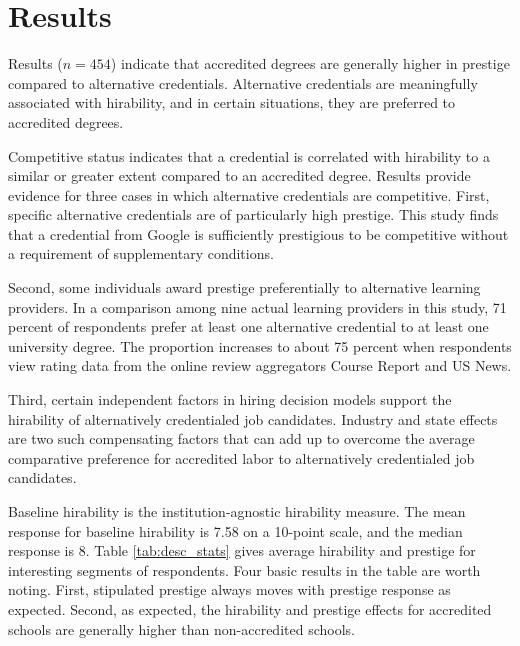 \documentclass[review]{elsarticle}
\begin{document}
\section{Results}

Results ($n = 454$) indicate that accredited degrees are generally higher in prestige compared to alternative credentials.
Alternative credentials are meaningfully associated with hirability,
and in certain situations, they are preferred to accredited degrees.

Competitive status indicates that a credential is correlated with hirability to a similar or greater extent compared to an accredited degree.
Results provide evidence for three cases in which alternative credentials are competitive.
First, specific alternative credentials are of particularly high prestige.
This study finds that a credential from Google is sufficiently prestigious to be competitive without a requirement of supplementary conditions.

Second, some individuals award prestige preferentially to alternative learning providers.
In a comparison among nine actual learning providers in this study,
71 percent of respondents prefer at least one alternative credential to at least one university degree.
The proportion increases to about 75 percent when respondents view rating data from the online review aggregators Course Report and US News.

Third, certain independent factors in hiring decision models support the hirability of alternatively credentialed job candidates.
Industry and state effects are two such compensating factors that can add up to overcome the average comparative preference for accredited labor to alternatively credentialed job candidates.

Baseline hirability is the institution-agnostic hirability measure.
The mean response for baseline hirability is 7.58 on a 10-point scale, and the median response is 8.
Table \ref{tab:desc_stats} gives average hirability and prestige for interesting segments of respondents.
Four basic results in the table are worth noting.
First, stipulated prestige always moves with prestige response as expected.
Second, as expected, the hirability and prestige effects for accredited schools are generally higher than non-accredited schools.
\end{document}
